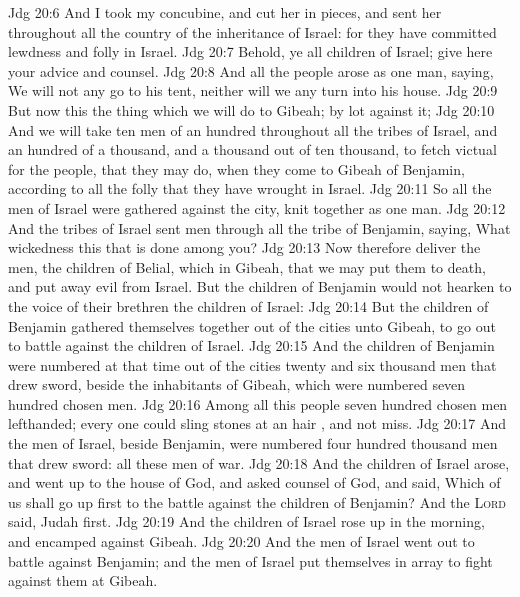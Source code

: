\vs Jdg 20:6 And I took my concubine, and cut her in pieces, and sent her throughout all the country of the inheritance of Israel: for they have committed lewdness and folly in Israel.
\vs Jdg 20:7 Behold, ye  all children of Israel; give here your advice and counsel.
\vs Jdg 20:8 And all the people arose as one man, saying, We will not any  go to his tent, neither will we any  turn into his house.
\vs Jdg 20:9 But now this  the thing which we will do to Gibeah;  by lot against it;
\vs Jdg 20:10 And we will take ten men of an hundred throughout all the tribes of Israel, and an hundred of a thousand, and a thousand out of ten thousand, to fetch victual for the people, that they may do, when they come to Gibeah of Benjamin, according to all the folly that they have wrought in Israel.
\vs Jdg 20:11 So all the men of Israel were gathered against the city, knit together as one man.
\vs Jdg 20:12 And the tribes of Israel sent men through all the tribe of Benjamin, saying, What wickedness  this that is done among you?
\vs Jdg 20:13 Now therefore deliver  the men, the children of Belial, which  in Gibeah, that we may put them to death, and put away evil from Israel. But the children of Benjamin would not hearken to the voice of their brethren the children of Israel:
\vs Jdg 20:14 But the children of Benjamin gathered themselves together out of the cities unto Gibeah, to go out to battle against the children of Israel.
\vs Jdg 20:15 And the children of Benjamin were numbered at that time out of the cities twenty and six thousand men that drew sword, beside the inhabitants of Gibeah, which were numbered seven hundred chosen men.
\vs Jdg 20:16 Among all this people  seven hundred chosen men lefthanded; every one could sling stones at an hair , and not miss.
\vs Jdg 20:17 And the men of Israel, beside Benjamin, were numbered four hundred thousand men that drew sword: all these  men of war.
\vs Jdg 20:18 And the children of Israel arose, and went up to the house of God, and asked counsel of God, and said, Which of us shall go up first to the battle against the children of Benjamin? And the \textsc{Lord} said, Judah  first.
\vs Jdg 20:19 And the children of Israel rose up in the morning, and encamped against Gibeah.
\vs Jdg 20:20 And the men of Israel went out to battle against Benjamin; and the men of Israel put themselves in array to fight against them at Gibeah.
